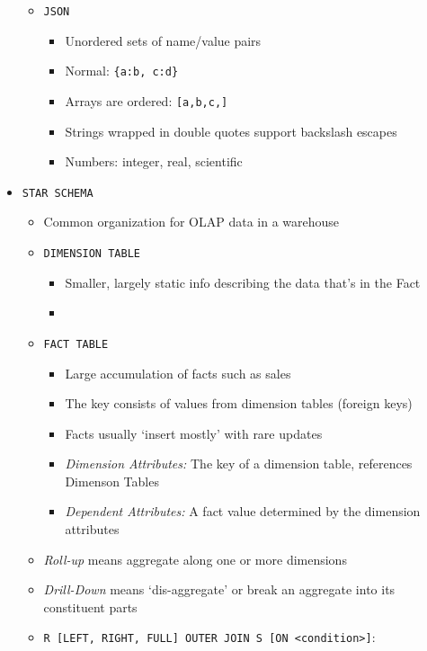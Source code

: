 \documentclass[landscape,8pt]{extarticle}
\newcommand{\code}{\lstinline}
\begin{document}
\begin{multicols}{4}
\begin{itemize}
\begin{itemize}
\begin{itemize}
        \end{itemize}
        \item \code{JSON}
        \begin{itemize}
            \item Unordered sets of name/value pairs
            \item Normal: \lstinline|{a:b, c:d}|
            \item Arrays are ordered: \code{[a,b,c,]}
            \item Strings wrapped in double quotes support backslash escapes
            \item Numbers: integer, real, scientific
        \end{itemize}
    \end{itemize}
    \item \code{STAR SCHEMA}
    \begin{itemize}
        \item Common organization for OLAP data in a warehouse
        \item \code{DIMENSION TABLE}
        \begin{itemize}
            \item Smaller, largely static info describing the data that's in the Fact
            \item 
        \end{itemize}
        \item \code{FACT TABLE}
        \begin{itemize}
            \item Large accumulation of facts such as sales
            \item The key consists of values from dimension tables (foreign keys)
            \item Facts usually `insert mostly' with rare updates
            \item \emph{Dimension Attributes:} The key of a dimension table, references Dimenson Tables
            \item \emph{Dependent Attributes:} A fact value determined by the dimension attributes
        \end{itemize}
        \item \emph{Roll-up} means aggregate along one or more dimensions
        \item \emph{Drill-Down} means `dis-aggregate' or break an aggregate into its constituent parts
    \item \code{R [LEFT, RIGHT, FULL] OUTER JOIN S [ON <condition>]}: 
    \begin{itemize}

\end{itemize}
\end{itemize}
\end{itemize}
\end{multicols}
\end{document}
